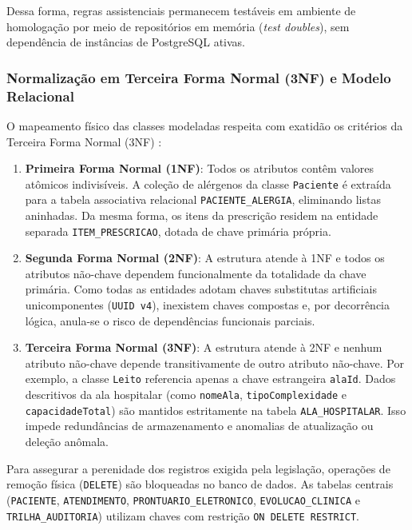 Dessa forma, regras assistenciais permanecem testáveis em ambiente de homologação por meio de repositórios em memória (\textit{test doubles}), sem dependência de instâncias de PostgreSQL ativas.

\subsubsection{Normalização em Terceira Forma Normal (3NF) e Modelo Relacional}
O mapeamento físico das classes modeladas respeita com exatidão os critérios da Terceira Forma Normal (3NF) \cite{pressman:2016}:

\begin{enumerate}[leftmargin=*]
    \item \textbf{Primeira Forma Normal (1NF)}: Todos os atributos contêm valores atômicos indivisíveis. A coleção de alérgenos da classe \texttt{Paciente} é extraída para a tabela associativa relacional \texttt{PACIENTE\_ALERGIA}, eliminando listas aninhadas. Da mesma forma, os itens da prescrição residem na entidade separada \texttt{ITEM\_PRESCRICAO}, dotada de chave primária própria.
    \item \textbf{Segunda Forma Normal (2NF)}: A estrutura atende à 1NF e todos os atributos não-chave dependem funcionalmente da totalidade da chave primária. Como todas as entidades adotam chaves substitutas artificiais unicomponentes (\texttt{UUID v4}), inexistem chaves compostas e, por decorrência lógica, anula-se o risco de dependências funcionais parciais.
    \item \textbf{Terceira Forma Normal (3NF)}: A estrutura atende à 2NF e nenhum atributo não-chave depende transitivamente de outro atributo não-chave. Por exemplo, a classe \texttt{Leito} referencia apenas a chave estrangeira \texttt{alaId}. Dados descritivos da ala hospitalar (como \texttt{nomeAla}, \texttt{tipoComplexidade} e \texttt{capacidadeTotal}) são mantidos estritamente na tabela \texttt{ALA\_HOSPITALAR}. Isso impede redundâncias de armazenamento e anomalias de atualização ou deleção anômala.
\end{enumerate}

Para assegurar a perenidade dos registros exigida pela legislação, operações de remoção física (\texttt{DELETE}) são bloqueadas no banco de dados. As tabelas centrais (\texttt{PACIENTE}, \texttt{ATENDIMENTO}, \texttt{PRONTUARIO\_ELETRONICO}, \texttt{EVOLUCAO\_CLINICA} e \texttt{TRILHA\_AUDITORIA}) utilizam chaves com restrição \texttt{ON DELETE RESTRICT}.

